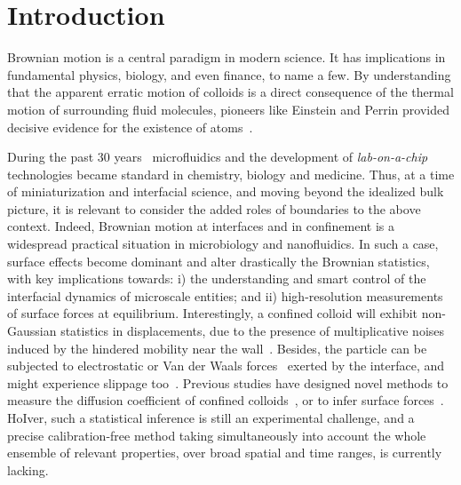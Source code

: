 \section{Introduction}
  \label{sec:Intro}



Brownian motion is a central paradigm in modern science. It has implications in fundamental physics, biology, and even finance, to name a few. By understanding that the apparent erratic motion of colloids is a direct consequence of the thermal motion of surrounding fluid molecules, pioneers like Einstein and Perrin provided decisive evidence for the existence of atoms~\cite{einstein_uber_1905,perrin_les_2014}.

During the past 30 years~\cite{whitesides_origins_2006, convery_30_2019} microfluidics and the development of \textit{lab-on-a-chip} technologies \cite{neuzil_revisiting_2012,ding_surface_2013} became standard in chemistry, biology and medicine. Thus, at a time of miniaturization and interfacial science, and moving beyond the idealized bulk picture, it is relevant to  consider the added roles of boundaries to the above context. Indeed, Brownian motion at interfaces and in confinement is a widespread practical situation in microbiology and nanofluidics. In such a case, surface effects become dominant and alter drastically the Brownian statistics, with key implications towards: i) the understanding and smart control of the interfacial dynamics of microscale entities; and ii) high-resolution measurements of surface forces at equilibrium. Interestingly, a confined colloid will exhibit non-Gaussian statistics in displacements, due to the presence of multiplicative noises induced by the hindered mobility near the wall~\cite{felderhof_effect_2005,wang_anomalous_2009,chechkin_brownian_2017}. Besides, the particle can be subjected to electrostatic or Van der Waals forces~\cite{bouzigues_nanofluidics_2008} exerted by the interface, and might experience slippage too~\cite{joly_probing_2006,mo_brownian_2017}. Previous studies have designed novel methods to measure the diffusion coefficient of confined colloids~\cite{faucheux_confined_1994,dufresne_brownian_2001,carbajal-tinoco_asymmetry_2007,eral_anisotropic_2010,sharma_high-precision_2010,mo_broadband_2015,matse_test_2017}, or to infer surface forces~\cite{prieve_measurement_1999,banerjee_experimental_2005,sainis_statistics_2007,volpe_influence_2010,wang_measurement_2011,li_subfemtonewton_2019}. HoIver, such a statistical inference is still an experimental challenge, and a precise calibration-free method taking simultaneously into account the whole ensemble of relevant properties, over broad spatial and time ranges, is currently lacking.

